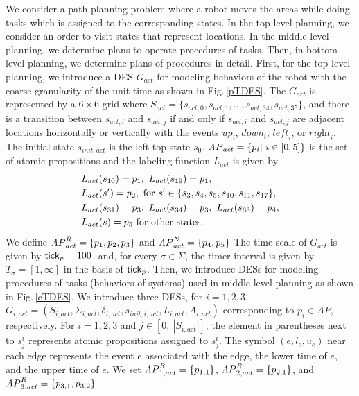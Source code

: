 \documentclass[journal,twoside,web]{IEEEtran}
\newcommand{\rfig}[1]{Fig.\,\ref{#1}}
\newcommand{\tick}{{\sf tick}}
\newcommand{\AP}{{\textit AP}}
\begin{document}
We consider a path planning problem where a robot moves the areas while doing tasks which is assigned to the corresponding states.
In the top-level planning, we consider an order to visit states that represent locations.
In the middle-level planning, we determine plans to operate procedures of tasks. 
Then, in bottom-level planning, we determine plans of procedures in detail.
%
%
First, for the top-level planning, we introduce a DES $G_{act}$ for modeling behaviors of the robot 
 with the coarse granularity of the unit time as shown in \rfig{pTDES}.
%
The $G_{act}$ is represented by a $6\times6$ grid where $S_{act}=\{s_{act,0},s_{act,1},\ldots,s_{act,{34}},s_{act,{35}}\}$, and there is a transition between $s_{act,i}$ and $s_{act,j}$ if and only if $s_{act,i}$ and $s_{act,j}$ are adjacent locations horizontally or vertically with the events $\textit{up}_i$, $\textit{down}_i$, $\textit{left}_i$, or $\textit{right}_i$.
%
The initial state $s_{init,act}$ is the left-top state $s_0$.
$\AP_{act}=\{p_i|~i\in[0,5]\}$ is the set of atomic propositions and the labeling function $L_{act}$ is given by
\begin{align}
&L_{act}(s_{ 10 }) =  p_1,\
L_{act}(s_{19}) =  p_1, \notag \\
&L_{act}(s') = p_2,\mbox{ for } s'\in\{s_3,s_4,s_5,s_{10},s_{11},s_{17}\}, \notag\\
&L_{act}(s_{ 31 }) = p_3,\ 
L_{act}(s_{ 34 }) =  p_3, \ 
L_{act}(s_{ 63 }) =  p_4,\notag\\
&L_{act}(s) =  p_5\mbox{ for other states.}%
\end{align}
We define $\AP_{act}^R=\{p_1,p_2,p_3\}$ and $\AP_{act}^N=\{p_4,p_5\}$ 
The time scale of $G_{act}$ is given by ${\tick}_p=100$, and, for every $\sigma\in \Sigma$, the timer interval is given by $T_\sigma=[1,\infty]$ in the basis of ${\tick}_p$.
%
%
Then, we introduce DESs for modeling procedures of tasks (behaviors of systems) used in middle-level planning as shown in \rfig{cTDES}.
We introduce three DESs, for $i=1,2,3$, $G_{i,act}=(S_{i,act}, \Sigma_{i,act}, \delta_{i,act},s_{init,i,act}, L_{i,act}, A_{i,act})$ corresponding to $p_i\in \textit{AP}$, respectively.
For $i=1,2,3$ and $j\in[0,\ |S_{i,act}|]$, the element in parentheses next to $s_j^i$ represents atomic propositions assigned to $s_j^i$.
%
The symbol $(e,l_e,u_e)$ near each edge represents the event  $e$ associated with the edge, the lower time of $e$, and the upper time of $e$.
We set $\AP_{1,act}^R=\{p_{1,1}\}$, $\AP_{2,act}^R=\{p_{2,1}\}$, and $\AP_{3,act}^R=\{p_{3,1},p_{3,2}\}$
%
\end{document}
